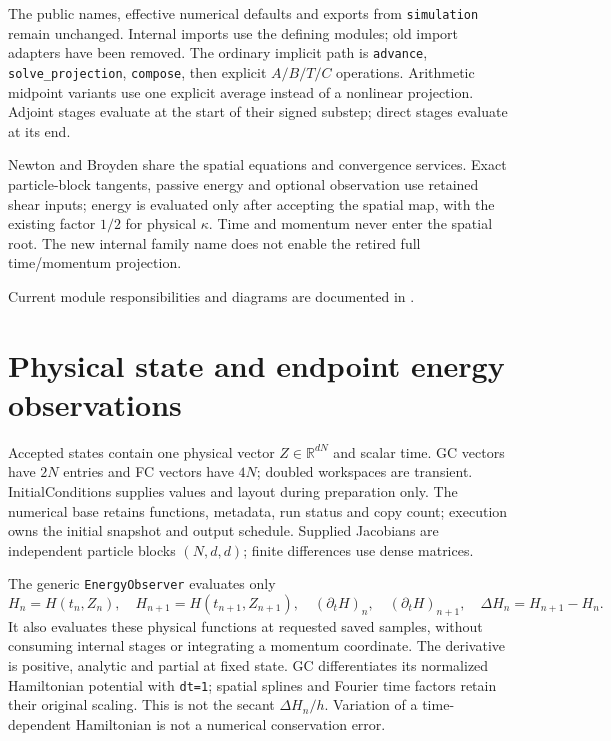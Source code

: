 \documentclass[11pt,a4paper]{article}
\begin{document}
The public names, effective numerical defaults and exports from \texttt{simulation}
remain unchanged. Internal imports use the defining modules; old import
adapters have been removed. The ordinary implicit path is \texttt{advance}, \texttt{solve\_projection},
\texttt{compose}, then explicit $A/B/T/C$ operations.
Arithmetic midpoint variants use one explicit average instead of a nonlinear
projection. Adjoint stages evaluate at the start of their signed substep;
direct stages evaluate at its end.

Newton and Broyden share the spatial equations and convergence services.
Exact particle-block tangents, passive energy and optional observation use
retained shear inputs; energy is evaluated only after accepting the spatial
map, with the existing factor $1/2$ for physical $\kappa$. Time and momentum
never enter the spatial root. The new internal family name does not enable
the retired full time/momentum projection.

Current module responsibilities and diagrams are documented in
.

\section{Physical state and endpoint energy observations}
Accepted states contain one physical vector $Z\in\mathbb{R}^{dN}$ and scalar time.
GC vectors have $2N$ entries and FC vectors have $4N$; doubled workspaces are
transient. InitialConditions supplies values and layout during preparation only.
The numerical base retains functions, metadata, run status and copy count;
execution owns the initial snapshot and output schedule. Supplied Jacobians are
independent particle blocks $(N,d,d)$; finite differences use dense matrices.

The generic \texttt{EnergyObserver} evaluates only
\[
 H_n=H(t_n,Z_n),\quad H_{n+1}=H(t_{n+1},Z_{n+1}),\quad
 (\partial_tH)_n,\quad (\partial_tH)_{n+1},\quad
 \Delta H_n=H_{n+1}-H_n.
\]
It also evaluates these physical functions at requested saved samples, without
consuming internal stages or integrating a momentum coordinate. The derivative
is positive, analytic and partial at fixed state. GC differentiates its normalized
Hamiltonian potential with \texttt{dt=1}; spatial splines and Fourier time factors
retain their original scaling. This is not the secant $\Delta H_n/h$.
Variation of a time-dependent Hamiltonian is not a numerical conservation error.
\end{document}
